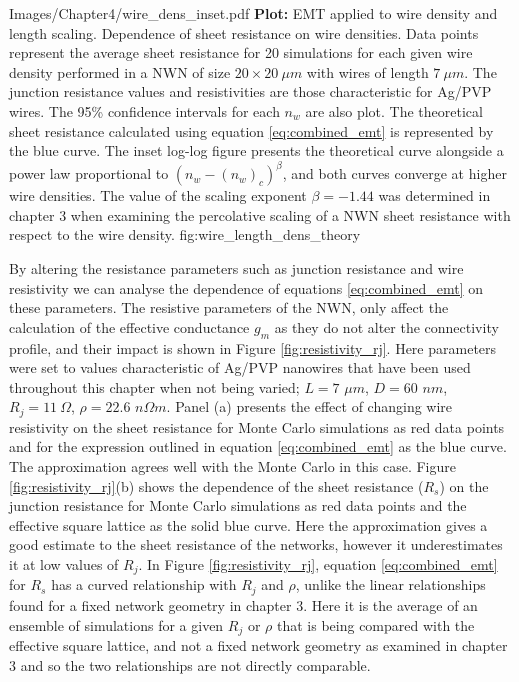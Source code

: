{Images/Chapter4/wire_dens_inset.pdf}
{\textbf{Plot:} EMT applied to wire density and length scaling.}
{Dependence of sheet resistance on wire densities. Data points represent the average sheet resistance for 20 simulations for each given wire density performed in a NWN of size $20\times 20~ \mu m$ with wires of length $7~ \mu m$. The junction resistance values and resistivities are those characteristic for Ag/PVP wires\cite{rocha2015}. The 95\% confidence intervals for each $n_w$ are also plot. The theoretical sheet resistance calculated using equation \ref{eq:combined_emt} is represented by the blue curve. The inset log-log figure presents the theoretical curve alongside a power law proportional to $(n_w - (n_w)_c)^{\beta}$, and both curves converge at higher wire densities. The value of the scaling exponent $\beta=-1.44$ was determined in chapter 3 when examining the percolative scaling of a NWN sheet resistance with respect to the wire density.}
{fig:wire_length_dens_theory}

By altering the resistance parameters such as junction resistance and wire resistivity we can analyse the dependence of equations \ref{eq:combined_emt} on these parameters. The resistive parameters of the NWN, only affect the calculation of the effective conductance $g_m$ as they do not alter the connectivity profile, and their impact is shown in Figure \ref{fig:resistivity_rj}. Here parameters were set to values characteristic of Ag/PVP nanowires that have been used throughout this chapter when not being varied; $L=7$ $\mu m$, $D = 60$ $nm$, $R_j = 11~ \Omega$, $\rho = 22.6$ $n\Omega m$. Panel (a) presents the effect of changing wire resistivity on the sheet resistance for Monte Carlo simulations as red data points and for the expression outlined in equation \ref{eq:combined_emt} as the blue curve. The approximation agrees well with the Monte Carlo in this case. Figure \ref{fig:resistivity_rj}(b) shows the dependence of the sheet resistance ($R_s$) on the junction resistance for Monte Carlo simulations as red data points and the effective square lattice as the solid blue curve. Here the approximation gives a good estimate to the sheet resistance of the networks, however it underestimates it at low values of $R_j$. In Figure \ref{fig:resistivity_rj}, equation \ref{eq:combined_emt} for $R_s$ has a curved relationship with $R_j$ and $\rho$, unlike the linear relationships found for a fixed network geometry in chapter 3. Here it is the average of an ensemble of simulations for a given $R_j$ or $\rho$ that is being compared with the effective square lattice, and not a fixed network geometry as examined in chapter 3 and so the two relationships are not directly comparable. 

